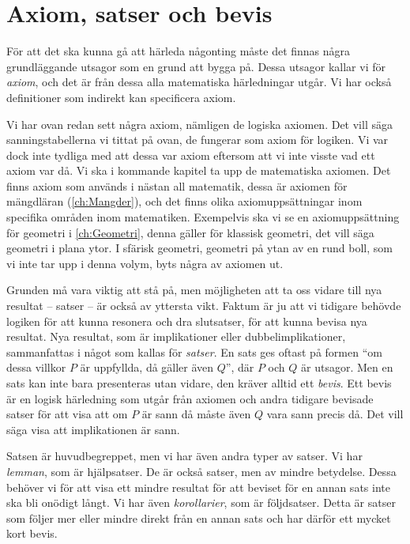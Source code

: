 \section{Axiom, satser och bevis}

För att det ska kunna gå att härleda någonting måste det finnas
några grundläggande utsagor som en grund att bygga på.
Dessa utsagor kallar vi för \emph{axiom}, och det är från dessa
alla matematiska härledningar utgår.
Vi har också definitioner som indirekt kan specificera axiom.

Vi har ovan redan sett några axiom, nämligen de logiska axiomen.
Det vill säga sanningstabellerna vi tittat på ovan, de fungerar som axiom för 
logiken.
Vi var dock inte tydliga med att dessa var axiom eftersom att vi inte visste 
vad ett axiom var då.
Vi ska i kommande kapitel ta upp de matematiska axiomen.
Det finns axiom som används i nästan all matematik, dessa är axiomen för
mängdläran (\cref{ch:Mangder}), och det finns olika axiomuppsättningar 
inom specifika områden inom matematiken.
Exempelvis ska vi se en axiomuppsättning för geometri 
i \cref{ch:Geometri}, denna gäller för klassisk geometri, det vill säga 
geometri i plana ytor.
I sfärisk geometri, geometri på ytan av en rund boll, som vi inte tar upp 
i denna volym, byts några av axiomen ut.

Grunden må vara viktig att stå på, men möjligheten att ta oss vidare till nya 
resultat -- satser -- är också av yttersta vikt.
Faktum är ju att vi tidigare behövde logiken för att kunna resonera och dra
slutsatser, för att kunna bevisa nya resultat.
Nya resultat, som är implikationer eller dubbelimplikationer, sammanfattas i
något som kallas för \emph{satser}.
En sats ges oftast på formen \enquote{om dessa villkor \(P\) är uppfyllda, då 
gäller även \(Q\)}, där \(P\) och \(Q\) är utsagor.
Men en sats kan inte bara presenteras utan vidare, den kräver alltid ett
\emph{bevis}.
Ett bevis är en logisk härledning som utgår från axiomen och andra tidigare
bevisade satser för att visa att om \(P\) är sann då måste även \(Q\) vara sann
precis då.
Det vill säga visa att implikationen är sann.

Satsen är huvudbegreppet, men vi har även andra typer av satser.
Vi har \emph{lemman}, som är hjälpsatser.
De är också satser, men av mindre betydelse.
Dessa behöver vi för att visa ett mindre resultat för att beviset för en annan
sats inte ska bli onödigt långt.
Vi har även \emph{korollarier}, som är
följdsatser.
Detta är satser som följer mer eller mindre direkt från en annan sats och har
därför ett mycket kort bevis.

